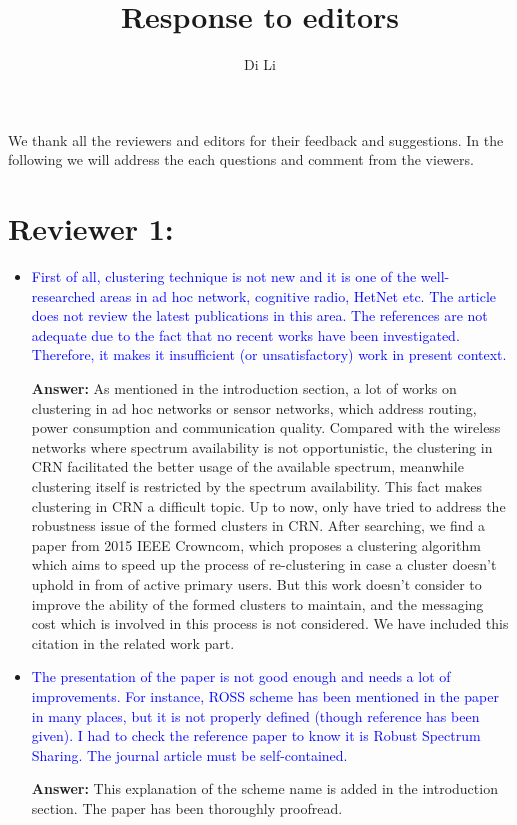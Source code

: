 \documentclass[10pt,a4paper]{article}
\author{Di Li}
\title{Response to editors}
\begin{document}
We thank all the reviewers and editors for their feedback and suggestions.
In the following we will address the each questions and comment from the viewers.

\section{Reviewer 1:}

\begin{itemize}

\item \textcolor{blue}{  First of all, clustering technique is not new and it is one of the well-researched areas in ad hoc network, cognitive radio, HetNet etc. The article does not review the latest publications in this area. The references are not adequate due to the fact that no recent works have been investigated. Therefore, it makes it insufficient (or unsatisfactory) work in present context.}

\textbf{Answer:} As mentioned in the introduction section, a lot of works on clustering in ad hoc networks or sensor networks, which address routing, power consumption and communication quality.
Compared with the wireless networks where spectrum availability is not opportunistic, the clustering in CRN facilitated the better usage of the available spectrum, meanwhile clustering itself is restricted by the spectrum availability.
This fact makes clustering in CRN a difficult topic.
Up to now, only \cite{LIU_TMC11_2, Li11_ROSS, mansoor_15_cluster_robust} have tried to address the robustness issue of the formed clusters in CRN.
After searching, we find a paper \cite{Mansoor2015} from 2015 IEEE Crowncom, which proposes a clustering algorithm which aims to speed up the process of re-clustering in case a cluster doesn't uphold in from of active primary users.
But this work doesn't consider to improve the ability of the formed clusters to maintain, and the messaging cost which is involved in this process is not considered.
We have included this citation in the related work part.

 
\item \textcolor{blue}{  The presentation of the paper is not good enough and needs a lot of improvements. For instance, ROSS scheme has been mentioned in the paper in many places, but it is not properly defined (though reference has been given). I had to check the reference paper to know it is Robust Spectrum Sharing. The journal article must be self-contained.}
    
    \textbf{Answer:} This explanation of the scheme name is added in the introduction section.
    The paper has been thoroughly proofread.
    

\end{itemize}
\end{document}
